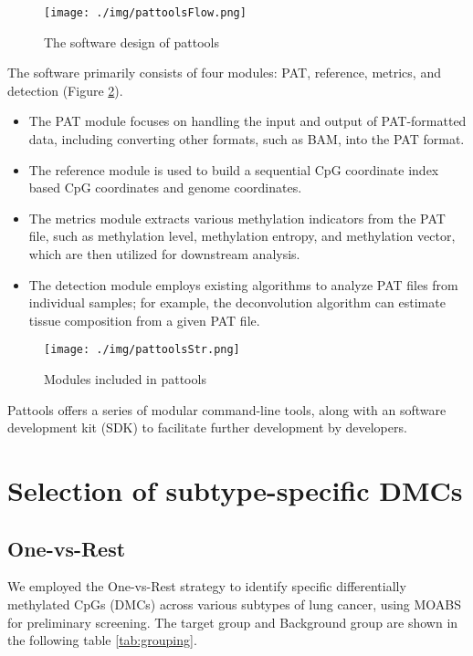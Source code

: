 \documentclass[12pt,letterpaper]{article}
\begin{document}
\begin{figure}[H]
    \centering
    \texttt{[image: ./img/pattoolsFlow.png]}
    \caption{The software design of pattools}
    \label{fig:pattools}
\end{figure}

The software primarily consists of four modules: PAT, reference, metrics, and detection  (Figure \ref*{fig:pattoolsStr}).

\begin{itemize}
    \item  The PAT module focuses on handling the input and output of PAT-formatted data, including converting other formats, such as BAM, into the PAT format. 
    \item  The reference module is used to build a sequential CpG coordinate index based CpG coordinates and genome coordinates. 
    \item  The metrics module extracts various methylation indicators from the PAT file, such as methylation level, methylation entropy, and methylation vector, which are then utilized for downstream analysis.
    \item  The detection module employs existing algorithms to analyze PAT files from individual samples; for example, the deconvolution algorithm can estimate tissue composition from a given PAT file.
\end{itemize}

\begin{figure}[H]
    \centering
    \texttt{[image: ./img/pattoolsStr.png]}
    \caption{Modules included in pattools}
    \label{fig:pattoolsStr}
\end{figure}

Pattools offers a series of modular command-line tools, along with an software development kit (SDK)
to facilitate further development by developers. 

\section{Selection of subtype-specific DMCs}\label{sec:selection-of-dmcs}

\subsection{One-vs-Rest}

We employed the One-vs-Rest strategy to identify specific differentially methylated CpGs (DMCs) across various
subtypes of lung cancer, using MOABS\cite{sun_moabs_2014} for preliminary screening. The target group and Background
group are shown in the following table \ref*{tab:grouping}.
\end{document}
